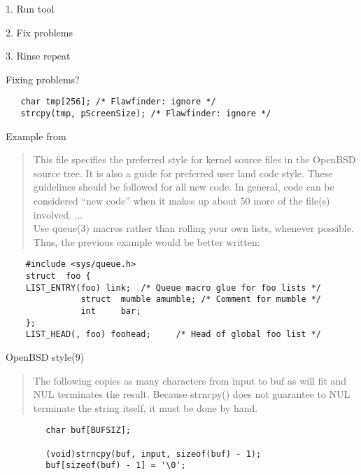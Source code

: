 \documentclass[Screen16to9,17pt]{foils}
\begin{document}

\begin{list1}
\item 1. Run tool
\item 2. Fix problems
\item 3. Rinse repeat
\end{list1}

Fixing problems?\\
\begin{verbatim}
   char tmp[256]; /* Flawfinder: ignore */
   strcpy(tmp, pScreenSize); /* Flawfinder: ignore */
\end{verbatim}
Example from 



\begin{quote}
This file specifies the preferred style for kernel source files in the
OpenBSD source tree.  It is also a guide for preferred user land code
style.  These guidelines should be followed for all new code.  In general,
code can be considered ``new code'' when it makes up about 50%
more of the file(s) involved. ...\\
Use queue(3) macros rather than rolling your own lists, whenever possible.
Thus, the previous example would be better written:
\end{quote}

\begin{verbatim}
    #include <sys/queue.h>
    struct  foo {
    LIST_ENTRY(foo) link;  /* Queue macro glue for foo lists */
               struct  mumble amumble; /* Comment for mumble */
               int     bar;
    };
    LIST_HEAD(, foo) foohead;     /* Head of global foo list */
\end{verbatim}


OpenBSD style(9)


\begin{quote}
The following copies as many characters from input to buf as will fit and
NUL terminates the result.  Because strncpy() does not guarantee to NUL
terminate the string itself, it must be done by hand.
\end{quote}

\begin{verbatim}
        char buf[BUFSIZ];

        (void)strncpy(buf, input, sizeof(buf) - 1);
        buf[sizeof(buf) - 1] = '\0';
\end{verbatim}
\end{document}

